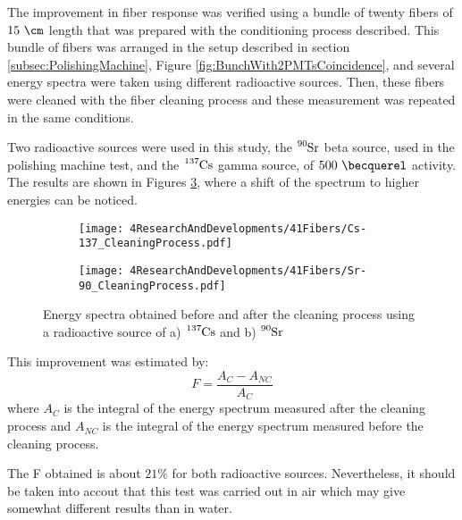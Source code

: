 The improvement in fiber response was verified using a bundle of twenty fibers of $15~\cm$ length  that was prepared with the conditioning process described. This bundle of fibers was arranged in the setup described in section \ref{subsec:PolishingMachine}, Figure \ref{fig:BunchWith2PMTsCoincidence}, and several energy spectra were taken using different radioactive sources. Then, these fibers were cleaned with the fiber cleaning process and these measurement was repeated in the same conditions.

Two radioactive sources were used in this study, the $\ce{^{90}Sr}$ beta source, used in the polishing machine test, and the $\ce{^{137}Cs}$ gamma source, of $500~\becquerel$ activity. The results are shown in Figures \ref{fig:ResultsOfCleaningProcess}, where a shift of the spectrum to higher energies can be noticed. 

\begin{figure}
\centering
    \begin{subfigure}[b]{1\textwidth}
    \centering
    \texttt{[image: 4ResearchAndDevelopments/41Fibers/Cs-137\_CleaningProcess.pdf]}  
    \caption{\label{subfig:EnergySpectrumCo60CleaningTest}}
    \end{subfigure}
    \hfill
    \begin{subfigure}[b]{1\textwidth}
    \centering
    \texttt{[image: 4ResearchAndDevelopments/41Fibers/Sr-90\_CleaningProcess.pdf]}  
    \caption{\label{subfig:EnergySpectrumSr90CleaningTest}}
    \end{subfigure}
 \caption{Energy spectra obtained before and after the cleaning process using a radioactive source of a) $\ce{^{137}Cs}$ and b) $\ce{^{90}Sr}$}
 \label{fig:ResultsOfCleaningProcess}
\end{figure}

This improvement was estimated by: 
\begin{equation}
F=\frac{A_{C}-A_{NC}}{A_{C}}
\label{eq:RelativeImprovement}
\end{equation}
where $A_{C}$ is the integral of the energy spectrum measured after the cleaning process and $A_{NC}$ is the integral of the energy spectrum measured before the cleaning process.

The F obtained is about $21\%$ for both radioactive sources. Nevertheless, it should be taken into accout that this test was carried out in air which may give somewhat different results than in water.

